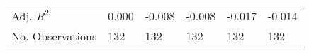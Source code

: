 \begin{table}[h]
\begin{adjustbox}{width=\linewidth, center}
\begin{tabular}{llllll}
	Adj. $R^2$       &                                                     0.000 &                                                    -0.008 &                                                    -0.008 &                                                    -0.017 &                                                    -0.014 \\
	No. Observations &                                                       132 &                                                       132 &                                                       132 &                                                       132 &                                                       132 \\
	\bottomrule
	\end{tabular}
	
\end{adjustbox}
	\end{table}

